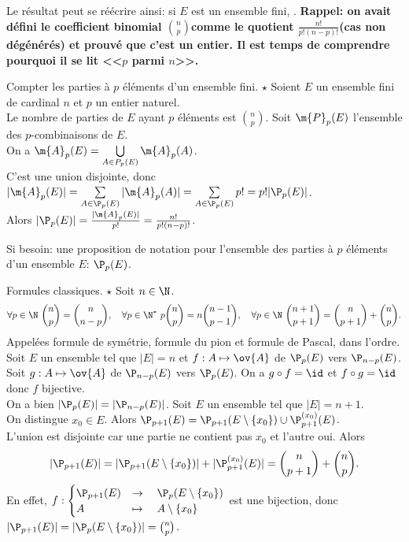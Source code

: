 \documentclass[11pt]{article}
\begin{document}
Le résultat peut se réécrire ainsi: si $E$ est un ensemble fini, .\n
\bf{Rappel:} on avait défini le coefficient binomial \Large$\binom{n}{p}$\normalsize comme le quotient \Large$\frac{n!}{p!(n-p)!}$\normalsize (cas non dégénérés) et prouvé que c'est un entier. Il est temps de comprendre pourquoi il se lit <<$p$ parmi $n$>>.

\begin{prop}{Compter les parties à $p$ éléments d'un ensemble fini. $\star$}{}
    Soient $E$ un ensemble fini de cardinal $n$ et $p$ un entier naturel.\\
    Le nombre de parties de $E$ ayant $p$ éléments est \Large$\binom{n}{p}$.
    \tcblower
    Soit $\m{P}_p(E)$ l'ensemble des $p$-combinaisons de $E$.\\
    On a $\m{A}_p(E)=\bigcup\limits_{A\in P_p(E)}\m{A}_p(A)$.\\
    C'est une union disjointe, donc $|\m{A}_p(E)|=\sum\limits_{A\in\P_p(E)}|\m{A}_p(A)|=\sum\limits_{A\in\P_p(E)}p!=p!|\P_p(E)|$.\\
    Alors $|\P_p(E)|=\frac{|\m{A}_p(E)|}{p!}=\frac{n!}{p!(n-p)!}$.
\end{prop}
Si besoin: une proposition de notation pour l'ensemble des parties à $p$ éléments d'un ensemble $E$: $\P_p(E)$.

\pagebreak
\begin{prop}{Formules classiques. $\star$}{}
    Soit $n\in\N$.
    \begin{equation*}
        \forall p\in\N~\binom{n}{p}=\binom{n}{n-p},\quad\forall p\in\N^*~p\binom{n}{p}=n\binom{n-1}{p-1},\quad\forall p\in\N~\binom{n+1}{p+1}=\binom{n}{p+1}+\binom{n}{p}.
    \end{equation*}
    Appelées formule de symétrie, formule du pion et formule de Pascal, dans l'ordre.
    \tcblower
     Soit $E$ un ensemble tel que $|E|=n$ et $f:A\mapsto\ov{A}$ de $\P_p(E)$ vers $\P_{n-p}(E)$.\\
    Soit $g:A\mapsto\ov{A}$ de $\P_{n-p}(E)$ vers $\P_p(E)$. On a $g\circ f=\id$ et $f\circ g=\id$ donc $f$ bijective.\\
    On a bien $|\P_p(E)|=|\P_{n-p}(E)|$.\n
     Soit $E$ un ensemble tel que $|E|=n+1$.\\
    On distingue $x_0\in E$. Alors $\P_{p+1}(E)=\P_{p+1}(E\setminus\{x_0\})\cup\P^{(x_0)}_{p+1}(E)$.\\
    L'union est disjointe car une partie ne contient pas $x_0$ et l'autre oui. Alors
    \begin{equation*}
        |\P_{p+1}(E)|=|\P_{p+1}(E\setminus\{x_0\})|+|\P_{p+1}^{(x_0)}(E)|=\binom{n}{p+1}+\binom{n}{p}.
    \end{equation*}
    En effet, $f:\begin{cases}
        \P_{p+1}(E)&\to\quad\P_{p}(E\setminus\{x_0\})\\
        A&\mapsto\quad A\setminus\{x_0\}
    \end{cases}$
    est une bijection, donc $|\P_{p+1}(E)|=|\P_{p}(E\setminus\{x_0\})|=\binom{n}{p}$.
\end{prop}
\end{document}
